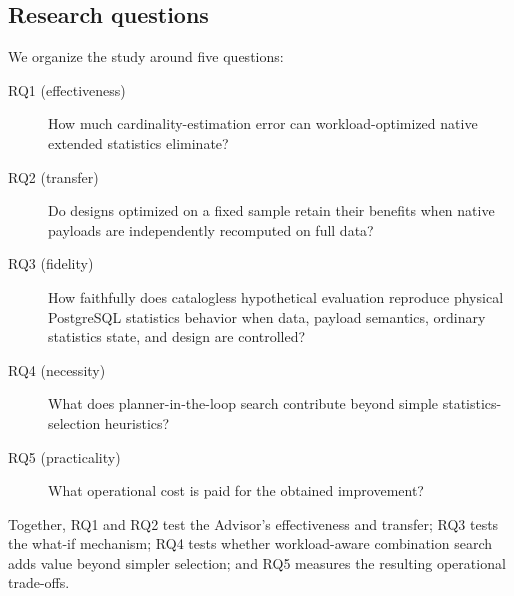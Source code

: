 \subsection{Research questions}

We organize the study around five questions:

\begin{description}
  \item[RQ1 (effectiveness)] How much cardinality-estimation error can
  workload-optimized native extended statistics eliminate?
  \item[RQ2 (transfer)] Do designs optimized on a fixed sample retain their
  benefits when native payloads are independently recomputed on full data?
  \item[RQ3 (fidelity)] How faithfully does catalogless hypothetical evaluation
  reproduce physical PostgreSQL statistics behavior when data, payload
  semantics, ordinary statistics state, and design are controlled?
  \item[RQ4 (necessity)] What does planner-in-the-loop search contribute beyond
  simple statistics-selection heuristics?
  \item[RQ5 (practicality)] What operational cost is paid for the obtained
  improvement?
\end{description}

Together, RQ1 and RQ2 test the Advisor's effectiveness and transfer; RQ3 tests
the what-if mechanism; RQ4 tests whether workload-aware combination search adds
value beyond simpler selection; and RQ5 measures the resulting operational
trade-offs.
